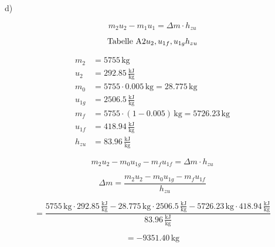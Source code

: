 d)

\begin{equation*}
m_2 u_2 - m_1 u_1 = \Delta m \cdot h_{zu}
\end{equation*}

\begin{equation*}
\text{Tabelle A2} \\
u_2, u_{1f}, u_{1g} \\
h_{zu}
\end{equation*}

\begin{align*}
m_2 &= 5755 \, \text{kg} \\
u_2 &= 292.85 \, \frac{\text{kJ}}{\text{kg}} \\
m_0 &= 5755 \cdot 0.005 \, \text{kg} = 28.775 \, \text{kg} \\
u_{1g} &= 2506.5 \, \frac{\text{kJ}}{\text{kg}} \\
m_f &= 5755 \cdot (1 - 0.005) \, \text{kg} = 5726.23 \, \text{kg} \\
u_{1f} &= 418.94 \, \frac{\text{kJ}}{\text{kg}} \\
h_{zu} &= 83.96 \, \frac{\text{kJ}}{\text{kg}}
\end{align*}

\begin{equation*}
m_2 u_2 - m_0 u_{1g} - m_f u_{1f} = \Delta m \cdot h_{zu}
\end{equation*}

\begin{equation*}
\Delta m = \frac{m_2 u_2 - m_0 u_{1g} - m_f u_{1f}}{h_{zu}}
\end{equation*}

\begin{equation*}
= \frac{5755 \, \text{kg} \cdot 292.85 \, \frac{\text{kJ}}{\text{kg}} - 28.775 \, \text{kg} \cdot 2506.5 \, \frac{\text{kJ}}{\text{kg}} - 5726.23 \, \text{kg} \cdot 418.94 \, \frac{\text{kJ}}{\text{kg}}}{83.96 \, \frac{\text{kJ}}{\text{kg}}}
\end{equation*}

\begin{equation*}
= -9351.40 \, \text{kg}
\end{equation*}
